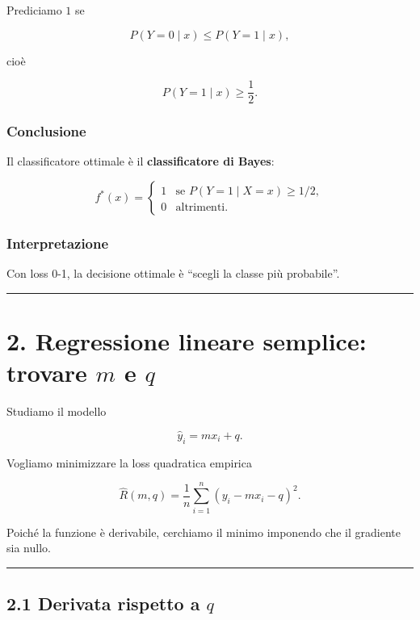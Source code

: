\documentclass[
]{article}
\begin{document}
Prediciamo \(1\) se

\[
P(Y=0\mid x)\le P(Y=1\mid x),
\]

cioè

\[
P(Y=1\mid x)\ge \frac{1}{2}.
\]

\subsubsection{Conclusione}\label{conclusione-2}

Il classificatore ottimale è il \textbf{classificatore di Bayes}:

\[
f^*(x)=
\begin{cases}
1 & \text{se } P(Y=1\mid X=x)\ge 1/2,\\
0 & \text{altrimenti.}
\end{cases}
\]

\subsubsection{Interpretazione}\label{interpretazione-2}

Con loss 0-1, la decisione ottimale è ``scegli la classe più
probabile''.

\begin{center}\rule{0.5\linewidth}{0.5pt}\end{center}

\section{\texorpdfstring{2. Regressione lineare semplice: trovare \(m\)
e
\(q\)}{2. Regressione lineare semplice: trovare m e q}}\label{regressione-lineare-semplice-trovare-m-e-q}

Studiamo il modello

\[
\hat y_i = mx_i + q.
\]

Vogliamo minimizzare la loss quadratica empirica

\[
\hat R(m,q)=\frac{1}{n}\sum_{i=1}^n (y_i-mx_i-q)^2.
\]

Poiché la funzione è derivabile, cerchiamo il minimo imponendo che il
gradiente sia nullo.

\begin{center}\rule{0.5\linewidth}{0.5pt}\end{center}

\subsection{\texorpdfstring{2.1 Derivata rispetto a
\(q\)}{2.1 Derivata rispetto a q}}\label{derivata-rispetto-a-q}
\end{document}
